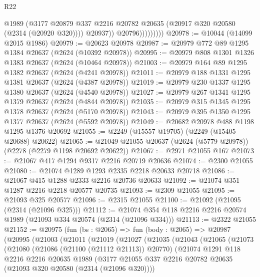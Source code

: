 \begin{lexlean}{R22}
\begin{coremodule}
                          @1989
                          (@3177
                            @20879
                            @337
                            @2216
                            @20782
                            @20635
                            (@20917 @320 @20580 (@2314 (@20920 @320))))
                          @20937))
                      @20796)))))))))
@20978 := @10044 (@14099 @2015 @1986)
@20979 := @20623 @20978
@20987 := @20979 @772 @89 @1295 @1384 @20637 (@2624 (@10392 @20978))
@20995 := @20979 @808 @1301 @1326 @1383 @20637 (@2624 (@10464 @20978))
@21003 := @20979 @164 @89 @1295 @1382 @20637 (@2624 (@4241 @20978))
@21011 := @20979 @188 @1331 @1295 @1381 @20637 (@2624 (@4387 @20978))
@21019 := @20979 @230 @1337 @1295 @1380 @20637 (@2624 (@4540 @20978))
@21027 := @20979 @267 @1341 @1295 @1379 @20637 (@2624 (@4844 @20978))
@21035 := @20979 @315 @1345 @1295 @1378 @20637 (@2624 (@5170 @20978))
@21043 := @20979 @395 @1350 @1295 @1377 @20637 (@2624 (@5592 @20978))
@21049 := @20682 @20978 @488 @1198 @1295 @1376 @20692
@21055 := @2249 (@15557 @19705) (@2249 (@15405 @20688) @20622)
@21065 := @21049 @21055 @20637 (@2624 (@5779 @20978)) (@2278 (@2279 @1198 @20692 @20622))
@21067 := @2971 @21055 @167
@21073 := @21067 @417 @1294 @9317 @2216 @20719 @20636
@21074 := @2300 @21055
@21080 := @21074 @1289 @1293 @2335 @2218 @20633 @20718
@21086 := @21067 @415 @1288 @2333 @2216 @20736 @20633
@21092 := @21074 @351 @1287 @2216 @2218 @20577 @20735
@21093 := @2309 @21055
@21095 := @21093 @325 @20577
@21096 := @2315 @21055
@21100 := @21092 (@21095 (@2314 (@21096 @325)))
@21112 := @21074 @354 @118 @2216 @2216 @20574 @1989 (@21093 @334 @20574 (@2314 (@21096 @334)))
@21113 := @2322 @21055
@21152 := @20975
    (fun (bs : @2065) =>
    fun (body : @2065) =>
    @20987
      (@20995
        (@21003
          (@21011
            (@21019
              (@21027
                (@21035
                  (@21043
                    (@21065
                      (@21073
                        (@21080
                          (@21086 (@21100 (@21112 @21113)) @20770)
                          (@21074
                            @1291
                            @118
                            @2216
                            @2216
                            @20635
                            @1989
                            (@3177
                              @21055
                              @337
                              @2216
                              @20782
                              @20635
                              (@21093 @320 @20580 (@2314 (@21096 @320))))

\end{coremodule}
\end{lexlean}
